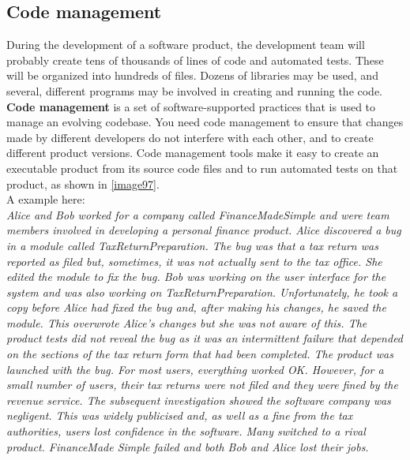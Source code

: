 \documentclass[10pt,a4paper]{report}
\begin{document}
\subsection{Code management}
During the development of a software product, the development team will
probably create tens of thousands of lines of code and automated tests. These will be organized into hundreds of files. Dozens of libraries may be used, and several, different programs may be involved in creating and
running the code.\\
\textbf{Code management} is a set of software-supported practices that is used to manage an evolving codebase.
You need code management to ensure that changes made by different developers do not interfere with each other, and to create different product versions.
Code management tools make it easy to create an executable product from its source code files and to run automated tests on that product, as shown in \ref{image97}.\\
A example here:\\
\textit{Alice and Bob worked for a company called FinanceMadeSimple and were team
	members involved in developing a personal finance product. Alice discovered a
	bug in a module called TaxReturnPreparation. The bug was that a tax return was
	reported as filed but, sometimes, it was not actually sent to the tax office. She
	edited the module to fix the bug. Bob was working on the user interface for the
	system and was also working on TaxReturnPreparation. Unfortunately, he took a
	copy before Alice had fixed the bug and, after making his changes, he saved the
	module. This overwrote Alice’s changes but she was not aware of this.
	The product tests did not reveal the bug as it was an intermittent failure that
	depended on the sections of the tax return form that had been completed. The
	product was launched with the bug. For most users, everything worked OK.
	However, for a small number of users, their tax returns were not filed and they
	were fined by the revenue service. The subsequent investigation showed the
	software company was negligent. This was widely publicised and, as well as a fine
	from the tax authorities, users lost confidence in the software. Many switched to a
	rival product. FinanceMade Simple failed and both Bob and Alice lost their jobs.}
\\
\end{document}
